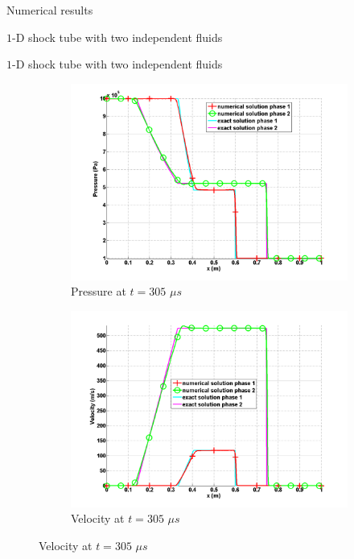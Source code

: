 \documentclass[xcolor=dvipsnames,10pt]{beamer}
\begin{document}
\begin{frame}{Numerical results}

\end{frame}
\begin{frame}{$1$-D shock tube with two independent fluids}
\begin{block}

\end{block}
\end{frame}
\begin{frame}{$1$-D shock tube with two independent fluids}
\begin{figure}
        \begin{subfigure}[b]{0.37\textwidth}
                \centering
                \includegraphics[width=\textwidth]{../figures/SEM/two_phases_pressure.png}
                \caption{Pressure at $t=305$ $\mu s$}
        \end{subfigure}%
        \begin{subfigure}[b]{0.37\textwidth}
                \centering
                \includegraphics[width=\textwidth]{../figures/SEM/two_phases_velocity.png}
                \caption{Velocity at $t=305$ $\mu s$}
        \end{subfigure}%


\end{figure}
\end{frame}
\end{document}
